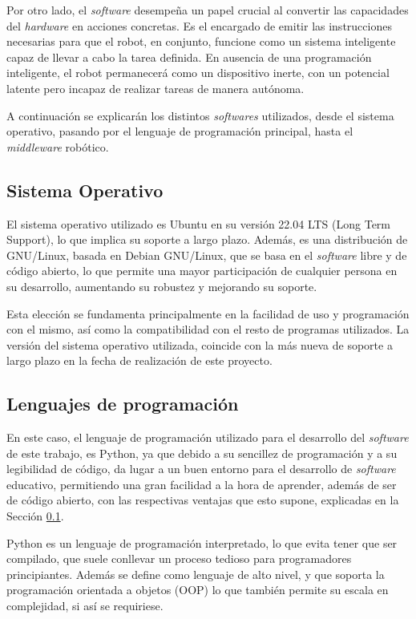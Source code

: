 Por otro lado, el \textit{software} desempeña un papel crucial al convertir las
capacidades del \textit{hardware} en acciones concretas.
Es el encargado de emitir las instrucciones necesarias para que el robot, en
conjunto, funcione como un sistema inteligente capaz de llevar a cabo la tarea
definida.
En ausencia de una programación inteligente, el robot permanecerá como un
dispositivo inerte, con un potencial latente pero incapaz de realizar tareas de
manera autónoma.

A continuación se explicarán los distintos \textit{softwares} utilizados, desde
el sistema operativo, pasando por el lenguaje de programación principal, hasta
el \textit{middleware} robótico.


\subsection{Sistema Operativo}
\label{sec:sistema_operativo}

El sistema operativo utilizado es Ubuntu en su versión 22.04 LTS (Long Term
Support), lo que implica su soporte a largo plazo.
Además, es una distribución de GNU/Linux, basada en Debian GNU/Linux, que se
basa en el \textit{software} libre y de código abierto, lo que permite una mayor
participación de cualquier persona en su desarrollo, aumentando su robustez y
mejorando su soporte.

Esta elección se fundamenta principalmente en la facilidad de uso y programación
con el mismo, así como la compatibilidad con el resto de programas utilizados.
La versión del sistema operativo utilizada, coincide con la más nueva de soporte
a largo plazo en la fecha de realización de este proyecto.


\subsection{Lenguajes de programación}
\label{sec:lenguaje_programacion}

En este caso, el lenguaje de programación utilizado para el desarrollo del
\textit{software} de este trabajo, es Python, ya que debido a su sencillez de
programación y a su legibilidad de código, da lugar a un buen entorno para el
desarrollo de \textit{software} educativo, permitiendo una gran facilidad a la
hora de aprender, además de ser de código abierto, con las respectivas ventajas
que esto supone, explicadas en la Sección \ref{sec:sistema_operativo}.

Python es un lenguaje de programación interpretado, lo que evita tener que ser
compilado, que suele conllevar un proceso tedioso para programadores
principiantes.
Además se define como lenguaje de alto nivel, y que soporta la programación
orientada a objetos (OOP) lo que también permite su escala en complejidad, si
así se requiriese.

